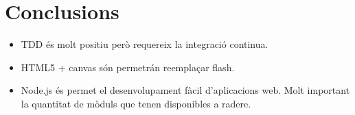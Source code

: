 \chapter{Conclusions}
\label{chap:conclusions}

\begin{itemize}
\item{TDD és molt positiu però requereix la integració continua.}
\item{HTML5 + canvas són permetrán reemplaçar flash.}
\item{Node.js és permet el desenvolupament fàcil d'aplicacions web. Molt important la quantitat de mòduls que tenen disponibles a radere.}
\end{itemize}

